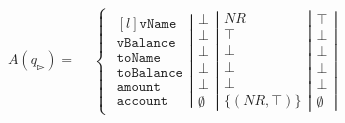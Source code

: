\begin{align}
    \label{eq:example-fixed-point-1}
    A(q_{\whitepointerright})=
    \begin{split}
        &\left\{\begin{matrix}
                   \left.\begin{matrix*}[l]
                             \texttt{vName}\\
                             \texttt{vBalance}\\
                             \texttt{toName}\\
                             \texttt{toBalance}\\
                             \texttt{amount}\\
                             \texttt{account}
                   \end{matrix*}\right|
                   \left.\begin{matrix}
                             \bot\\
                             \bot\\
                             \bot\\
                             \bot\\
                             \bot\\
                             \emptyset
                   \end{matrix}\right|
                   \left.\begin{matrix}
                             NR\\
                             \top\\
                             \bot\\
                             \bot\\
                             \bot\\
                             \{(NR,\top)\}
                   \end{matrix}\right|
                   \left.\begin{matrix}
                             \top\\
                             \bot\\
                             \bot\\
                             \bot\\
                             \bot\\
                             \emptyset
                   \end{matrix}\right|

\end{matrix}
\end{split}
\end{align}
